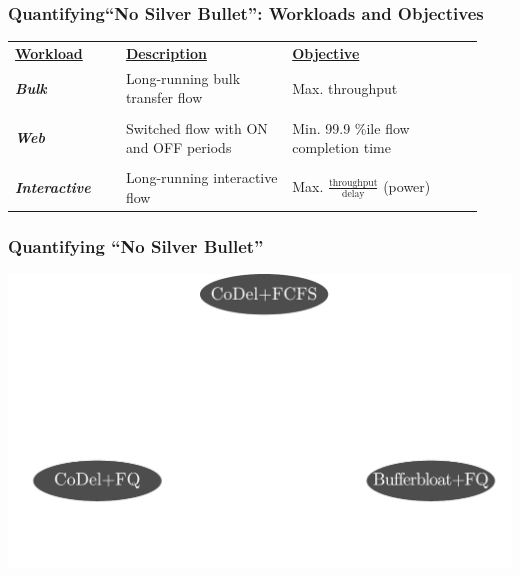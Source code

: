 \begin{Large}
\begin{frame}[plain]
\frametitle{Quantifying``No Silver Bullet'': Workloads and Objectives}

\begin{table}
\begin{tabular}{|p{0.22\linewidth}|p{0.33\linewidth}|p{0.38\linewidth}|}
\hline
{\bf \underline{Workload}} & {\bf \underline{Description}} & {\bf \underline{Objective}} \\
\textbf{\emph{Bulk}} & Long-running bulk transfer flow & Max. throughput \\
& &\\
\textbf{\emph{Web}} & Switched flow with ON and OFF periods &
Min. 99.9 \%ile flow completion time \\
& &\\
\textbf{\emph{Interactive}} & Long-running interactive flow & Max. $\frac{\mbox{throughput}}{\mbox{delay}}$ (power) \\ 
\hline
\end{tabular}
\end{table}
\end{frame}

\begin{frame}[plain]
\frametitle{Quantifying ``No Silver Bullet''}
\begin{center}
\includegraphics[width=\columnwidth]{fig-6.pdf}
\end{center}
\end{frame}


\end{Large}
